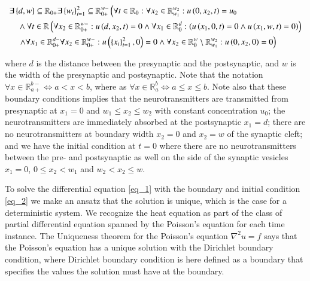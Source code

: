 \documentclass[11pt,english,a4paper]{article}
\begin{document}
\begin{flushleft}
\begin{align}
&\exists \left\lbrace{d, w}\right\rbrace \subseteq \mathbb{R}_{0+}\exists\left\lbrace{w_i}\right\rbrace_{i=1}^2 \subseteq \mathbb{R}_{0+}^{w-}\left(\forall t \in\mathbb{R}_{0}:\forall x_2 \in \mathbb{R}_{w_1}^{w_2} : u\left({0,x_2,t}\right) = u_0  \right.
\nonumber\\
& \quad \wedge \forall  t \in\mathbb{R} \left(\forall x_2\in\mathbb{R}_{0+}^{w-} : u\left({d, x_2, t}\right) = 0 
\wedge \forall x_1\in\mathbb{R}_{0}^d : \left(u\left({x_1,0, t}\right) = 0 \wedge u\left({x_1,w, t}\right) = 0\right) \right)
\nonumber\\
& \quad \left.\wedge
\forall x_1\in\mathbb{R}_{0+}^{d-}\forall x_2\in\mathbb{R}_{0+}^{w-} :u\left({\left\lbrace{x_i}\right\rbrace_{i=1}^2,0}\right)=0 \wedge \forall x_2 \in \mathbb{R}_0^w \setminus \mathbb{R}_{w_1}^{w_2} : u\left({0,x_2,0}\right) = 0 \right)
\label{eq_2}
\end{align}

where $d$ is the distance between the presynaptic and the postsynaptic, and $w$ is the width of the presynaptic and postsynaptic. Note that the notation $\forall x\in\mathbb{R}_{a+}^{b-} \Leftrightarrow a < x < b$, where as $\forall x\in\mathbb{R}_{a}^{b} \Leftrightarrow a \leq x \leq b$. Note also that these boundary conditions implies that the neurotransmitters are transmitted from presynaptic at $x_1=0$ and $w_1 \leq x_2\leq w_2$ with constant concentration $u_0$; the neurotransmitters are  immediately absorbed at the postsynaptic $x_1=d$; there are no neurotransmitters at boundary width $x_2=0$ and $x_2 = w$ of the synaptic cleft; and we have the initial condition at $t=0$ where there are no neurotransmitters between the pre- and postsynaptic as well on the side of the synaptic vesicles $x_1=0$, $0\leq x_2 < w_1$ and $w_2 < x_2 \leq w$. \linebreak


To solve the differential equation \eqref{eq_1} with the boundary and initial condition \eqref{eq_2} we make an ansatz that the solution is unique, which is the case for a deterministic system. We recognize the heat equation as part of the class of partial differential equation spanned by the Poisson's equation for each time instance. The Uniqueness theorem for the Poisson's equation $\nabla^2 u = f$ \cite{Uniqueness} says that the Poisson's equation has a unique solution with the Dirichlet boundary condition, where Dirichlet boundary condition is here defined as a boundary that specifies the values the solution must have at the boundary.  \linebreak


\end{flushleft}
\end{document}
